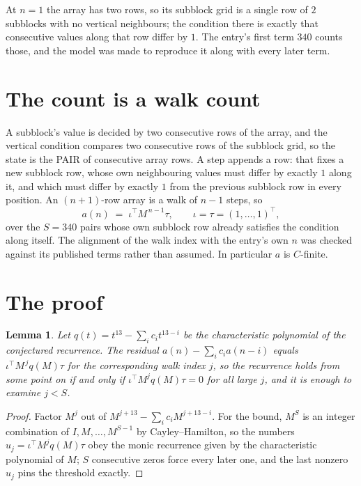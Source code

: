 \documentclass[11pt,a4paper]{article}
\theoremstyle{plain}
\newtheorem{lemma}[theorem]{Lemma}
\theoremstyle{definition}
\begin{document}
At $n=1$ the array has two rows, so its subblock grid is a single row of $2$ subblocks with
no vertical neighbours; the condition there is exactly that consecutive values along that row
differ by $1$. The entry's first term $340$ counts those, and the model was made to
reproduce it along with every later term.

\section{The count is a walk count}

A subblock's value is decided by two consecutive rows of the array, and the
vertical condition compares two consecutive rows of the subblock grid, so the state is the
PAIR of consecutive array rows. A step appends a row: that fixes a new subblock row, whose own
neighbouring values must differ by exactly $1$ along it, and which must differ by exactly
$1$ from the previous subblock row in every position. An $(n+1)$-row array is a walk of
$n-1$ steps, so
\[
a(n)\;=\;\iota^{\!\top}M^{\,n-1}\tau,\qquad\iota=\tau=(1,\dots,1)^{\!\top},
\]
over the $S=340$ pairs whose own subblock row already satisfies the condition along itself.
The alignment of the walk index with the entry's own $n$ was checked against its published
terms rather than assumed. In particular $a$ is $C$-finite.

\section{The proof}

\begin{lemma}\label{lem:crit}
Let $q(t)=t^{13}-\sum_i c_it^{13-i}$ be the characteristic polynomial of the
conjectured recurrence. The residual $a(n)-\sum_ic_ia(n-i)$ equals
$\iota^{\!\top}M^{\,j}q(M)\tau$ for the corresponding walk index $j$, so the recurrence
holds from some point on if and only if $\iota^{\!\top}M^{j}q(M)\tau=0$ for all large $j$,
and it is enough to examine $j<S$.
\end{lemma}

\begin{proof}
Factor $M^{j}$ out of $M^{j+13}-\sum_ic_iM^{j+13-i}$. For the bound, $M^{S}$
is an integer combination of $I,M,\dots,M^{S-1}$ by Cayley--Hamilton, so the numbers
$u_j=\iota^{\!\top}M^{j}q(M)\tau$ obey the monic recurrence given by the characteristic
polynomial of $M$; $S$ consecutive zeros force every later one, and the last nonzero $u_j$
pins the threshold exactly.
\end{proof}
\end{document}
